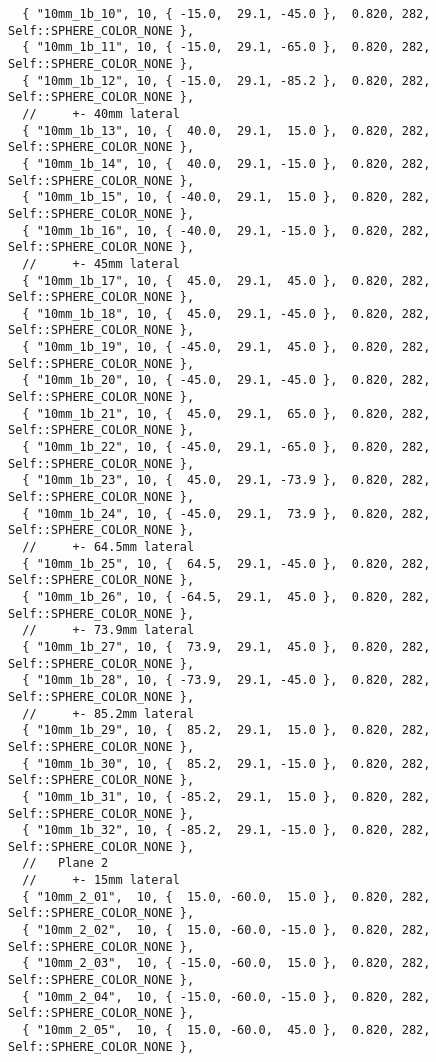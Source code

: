 \documentclass{InsightArticle}
\begin{document}
{\begin{verbatim}
  { "10mm_1b_10", 10, { -15.0,  29.1, -45.0 },  0.820, 282, Self::SPHERE_COLOR_NONE },
  { "10mm_1b_11", 10, { -15.0,  29.1, -65.0 },  0.820, 282, Self::SPHERE_COLOR_NONE },
  { "10mm_1b_12", 10, { -15.0,  29.1, -85.2 },  0.820, 282, Self::SPHERE_COLOR_NONE },
  //     +- 40mm lateral
  { "10mm_1b_13", 10, {  40.0,  29.1,  15.0 },  0.820, 282, Self::SPHERE_COLOR_NONE },
  { "10mm_1b_14", 10, {  40.0,  29.1, -15.0 },  0.820, 282, Self::SPHERE_COLOR_NONE },
  { "10mm_1b_15", 10, { -40.0,  29.1,  15.0 },  0.820, 282, Self::SPHERE_COLOR_NONE },
  { "10mm_1b_16", 10, { -40.0,  29.1, -15.0 },  0.820, 282, Self::SPHERE_COLOR_NONE },
  //     +- 45mm lateral
  { "10mm_1b_17", 10, {  45.0,  29.1,  45.0 },  0.820, 282, Self::SPHERE_COLOR_NONE },
  { "10mm_1b_18", 10, {  45.0,  29.1, -45.0 },  0.820, 282, Self::SPHERE_COLOR_NONE },
  { "10mm_1b_19", 10, { -45.0,  29.1,  45.0 },  0.820, 282, Self::SPHERE_COLOR_NONE },
  { "10mm_1b_20", 10, { -45.0,  29.1, -45.0 },  0.820, 282, Self::SPHERE_COLOR_NONE },
  { "10mm_1b_21", 10, {  45.0,  29.1,  65.0 },  0.820, 282, Self::SPHERE_COLOR_NONE },
  { "10mm_1b_22", 10, { -45.0,  29.1, -65.0 },  0.820, 282, Self::SPHERE_COLOR_NONE },
  { "10mm_1b_23", 10, {  45.0,  29.1, -73.9 },  0.820, 282, Self::SPHERE_COLOR_NONE },
  { "10mm_1b_24", 10, { -45.0,  29.1,  73.9 },  0.820, 282, Self::SPHERE_COLOR_NONE },
  //     +- 64.5mm lateral
  { "10mm_1b_25", 10, {  64.5,  29.1, -45.0 },  0.820, 282, Self::SPHERE_COLOR_NONE },
  { "10mm_1b_26", 10, { -64.5,  29.1,  45.0 },  0.820, 282, Self::SPHERE_COLOR_NONE },
  //     +- 73.9mm lateral
  { "10mm_1b_27", 10, {  73.9,  29.1,  45.0 },  0.820, 282, Self::SPHERE_COLOR_NONE },
  { "10mm_1b_28", 10, { -73.9,  29.1, -45.0 },  0.820, 282, Self::SPHERE_COLOR_NONE },
  //     +- 85.2mm lateral
  { "10mm_1b_29", 10, {  85.2,  29.1,  15.0 },  0.820, 282, Self::SPHERE_COLOR_NONE },
  { "10mm_1b_30", 10, {  85.2,  29.1, -15.0 },  0.820, 282, Self::SPHERE_COLOR_NONE },
  { "10mm_1b_31", 10, { -85.2,  29.1,  15.0 },  0.820, 282, Self::SPHERE_COLOR_NONE },
  { "10mm_1b_32", 10, { -85.2,  29.1, -15.0 },  0.820, 282, Self::SPHERE_COLOR_NONE },
  //   Plane 2
  //     +- 15mm lateral
  { "10mm_2_01",  10, {  15.0, -60.0,  15.0 },  0.820, 282, Self::SPHERE_COLOR_NONE },
  { "10mm_2_02",  10, {  15.0, -60.0, -15.0 },  0.820, 282, Self::SPHERE_COLOR_NONE },
  { "10mm_2_03",  10, { -15.0, -60.0,  15.0 },  0.820, 282, Self::SPHERE_COLOR_NONE },
  { "10mm_2_04",  10, { -15.0, -60.0, -15.0 },  0.820, 282, Self::SPHERE_COLOR_NONE },
  { "10mm_2_05",  10, {  15.0, -60.0,  45.0 },  0.820, 282, Self::SPHERE_COLOR_NONE },

\end{verbatim}}
\end{document}

